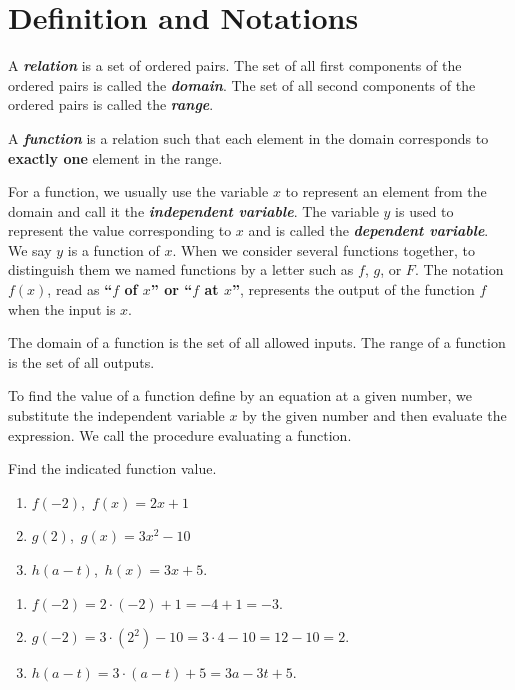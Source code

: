 \documentclass[
  en,11pt]{elegantbook}
\providecommand{\tightlist}{%
  \setlength{\itemsep}{0pt}\setlength{\parskip}{0pt}}
\renewenvironment{example}[1][]{
  \refstepcounter{exam}
  \par\noindent\textbf{\color{main}{\examplename} \theexam #1}
  \rmfamily
}{
  \par\ignorespacesafterend
}
\begin{document}
\hypertarget{definition-and-notations}{%
\section{Definition and Notations}\label{definition-and-notations}}

A \textbf{\emph{relation}} is a set of ordered pairs. The set of all first components of the ordered pairs is called the \textbf{\emph{domain}}. The set of all second components of the ordered pairs is called the \textbf{\emph{range}}.

A \textbf{\emph{function}} is a relation such that each element in the domain corresponds to \textbf{exactly one} element in the range.

For a function, we usually use the variable \(x\) to represent an element from the domain and call it the \textbf{\emph{independent variable}}. The variable \(y\) is used to represent the value corresponding to \(x\) and is called the \textbf{\emph{dependent variable}}. We say \(y\) is a function of \(x\). When we consider several functions together, to distinguish them we named functions by a letter such as \(f\), \(g\), or \(F\). The notation \(f(x)\), read as \textbf{``\(f\) of \(x\)'' or ``\(f\) at \(x\)''}, represents the output of the function \(f\) when the input is \(x\).

The domain of a function is the set of all allowed inputs. The range of a function is the set of all outputs.

To find the value of a function define by an equation at a given number, we substitute the independent variable \(x\) by the given number and then evaluate the expression. We call the procedure evaluating a function.

\begin{example}

Find the indicated function value.

\begin{enumerate}
\def\labelenumi{\arabic{enumi}.}
\tightlist
\item
  \(f(-2)\),~\(f(x)=2x+1\)
\item
  \(g(2)\),~\(g(x)=3x^2-10\)
\item
  \(h(a-t)\),~\(h(x)=3x+5\).
\end{enumerate}

\end{example}

\begin{solution}



\begin{enumerate}
\def\labelenumi{\arabic{enumi}.}
\tightlist
\item
  \(f(-2)=2\cdot(-2)+1=-4+1=-3\).
\item
  \(g(-2)=3\cdot(2^2)-10=3\cdot 4-10=12-10=2\).
\item
  \(h(a-t)=3\cdot(a-t)+5=3a-3t+5\).
\end{enumerate}

\end{solution}
\end{document}
